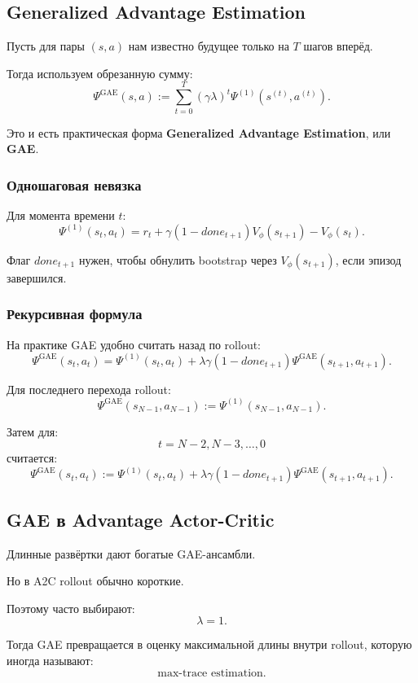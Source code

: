\documentclass[12pt,a4paper]{article}
\begin{document}
\subsection{Generalized Advantage Estimation}

Пусть для пары $(s,a)$ нам известно будущее только на $T$ шагов вперёд.

Тогда используем обрезанную сумму:
\[
\Psi^{\mathrm{GAE}}(s,a)
:=
\sum_{t=0}^{T}
(\gamma\lambda)^t
\Psi^{(1)}(s^{(t)},a^{(t)}).
\]

Это и есть практическая форма \textbf{Generalized Advantage Estimation}, или \textbf{GAE}.

\subsubsection{Одношаговая невязка}

Для момента времени $t$:
\[
\Psi^{(1)}(s_t,a_t)
=
r_t
+
\gamma(1-done_{t+1})V_\phi(s_{t+1})
-
V_\phi(s_t).
\]

Флаг $done_{t+1}$ нужен, чтобы обнулить bootstrap через $V_\phi(s_{t+1})$, если эпизод завершился.

\subsubsection{Рекурсивная формула}

На практике GAE удобно считать назад по rollout:
\[
\Psi^{\mathrm{GAE}}(s_t,a_t)
=
\Psi^{(1)}(s_t,a_t)
+
\lambda\gamma(1-done_{t+1})
\Psi^{\mathrm{GAE}}(s_{t+1},a_{t+1}).
\]

Для последнего перехода rollout:
\[
\Psi^{\mathrm{GAE}}(s_{N-1},a_{N-1})
:=
\Psi^{(1)}(s_{N-1},a_{N-1}).
\]

Затем для:
\[
t=N-2,N-3,\ldots,0
\]
считается:
\[
\Psi^{\mathrm{GAE}}(s_t,a_t)
:=
\Psi^{(1)}(s_t,a_t)
+
\lambda\gamma(1-done_{t+1})
\Psi^{\mathrm{GAE}}(s_{t+1},a_{t+1}).
\]

\subsection{GAE в Advantage Actor-Critic}

Длинные развёртки дают богатые GAE-ансамбли.

Но в A2C rollout обычно короткие.

Поэтому часто выбирают:
\[
\lambda=1.
\]

Тогда GAE превращается в оценку максимальной длины внутри rollout, которую иногда называют:
\[
\text{max-trace estimation}.
\]
\end{document}
